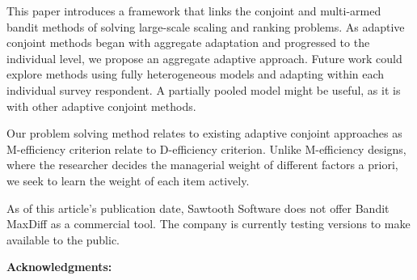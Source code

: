 \documentclass[nonblindrev]{informs3}
\begin{document}
This paper introduces a framework that links the conjoint and multi-armed bandit methods of solving large-scale scaling and ranking problems. As adaptive conjoint methods began with aggregate adaptation and progressed to the individual level, we propose an aggregate adaptive approach. Future work could explore methods using fully heterogeneous models and adapting within each individual survey respondent. A partially pooled model might be useful, as it is with other adaptive conjoint methods. 

Our problem solving method relates to existing adaptive conjoint approaches as M-efficiency criterion relate to D-efficiency criterion.  Unlike M-efficiency designs, where the researcher decides the managerial weight of different factors a priori, we seek to learn the weight of each item actively. 

As of this article's publication date, Sawtooth Software does not offer Bandit MaxDiff as a commercial tool. The company is currently testing versions to make available to the public.

\textbf{Acknowledgments:}
{%
}%


%
%
%


\end{document}
